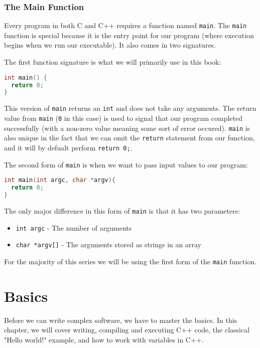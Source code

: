 \documentclass[11pt,fancy,authoryear]{elegantbook}
\begin{document}
\subsection{The Main Function}

Every program in both C and C++ requires a function named \lstinline{main}. The \lstinline{main} function is special because it is the entry point for our program (where execution begins when we run our executable). It also comes in two signatures.

The first function signature is what we will primarily use in this book:

\begin{lstlisting}[language=C++]
int main() {
  return 0;
}
\end{lstlisting}

This version of \lstinline{main} returns an \lstinline{int} and does not take any arguments. The return value from \lstinline{main} (\lstinline{0} in this case) is used to signal that our program completed successfully (with a non-zero value meaning some sort of error occured). \lstinline{main} is also unique in the fact that we can omit the \lstinline{return} statement from our function, and it will by defualt perform \lstinline{return 0;}.

The second form of \lstinline{main} is when we want to pass input values to our program:

\begin{lstlisting}[language=C++]
int main(int argc, char *argv){
  return 0;
}
\end{lstlisting}

The only major difference in this form of \lstinline{main} is that it has two parameters:

\begin{itemize}
  \item \lstinline{int argc} - The number of arguments
  \item \lstinline{char *argv[]} - The arguments stored as strings in an array
\end{itemize}

For the majority of this series we will be using the first form of the \lstinline{main} function.

\chapter{Basics}

Before we can write complex software, we have to master the basics. In this chapter, we will cover writing, compiling and executing C++ code, the classical "Hello world!" example, and how to work with variables in C++.
\end{document}
